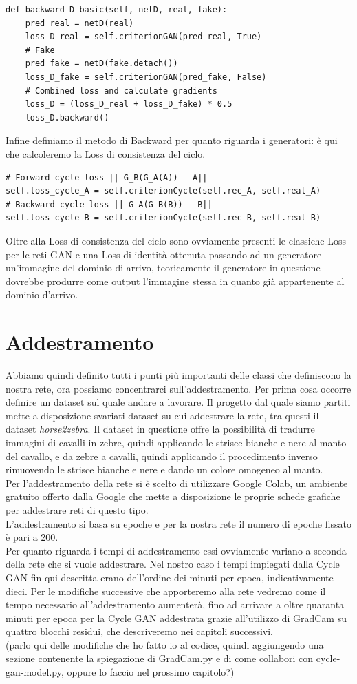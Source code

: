 \begin{verbatim}
def backward_D_basic(self, netD, real, fake):
    pred_real = netD(real)
    loss_D_real = self.criterionGAN(pred_real, True)
    # Fake
    pred_fake = netD(fake.detach())
    loss_D_fake = self.criterionGAN(pred_fake, False)
    # Combined loss and calculate gradients
    loss_D = (loss_D_real + loss_D_fake) * 0.5
    loss_D.backward()
\end{verbatim}
Infine definiamo il metodo di Backward per quanto riguarda i generatori: è qui che calcoleremo la Loss di consistenza del ciclo. 
\begin{verbatim}
# Forward cycle loss || G_B(G_A(A)) - A||
self.loss_cycle_A = self.criterionCycle(self.rec_A, self.real_A)
# Backward cycle loss || G_A(G_B(B)) - B||
self.loss_cycle_B = self.criterionCycle(self.rec_B, self.real_B)
\end{verbatim}
Oltre alla Loss di consistenza del ciclo sono ovviamente presenti le classiche Loss per le reti GAN e una Loss di identità ottenuta passando ad un generatore un'immagine del dominio di arrivo, teoricamente il generatore in questione dovrebbe produrre come output l'immagine stessa in quanto già appartenente al dominio d'arrivo.

\section{Addestramento}
Abbiamo quindi definito tutti i punti più importanti delle classi che definiscono la nostra rete, ora possiamo concentrarci sull'addestramento. Per prima cosa occorre definire un dataset sul quale andare a lavorare. Il progetto dal quale siamo partiti mette a disposizione svariati dataset su cui addestrare la rete, tra questi il dataset \emph{horse2zebra}. Il dataset in questione offre la possibilità di tradurre immagini di cavalli in zebre, quindi applicando le strisce bianche e nere al manto del cavallo, e da zebre a cavalli, quindi applicando il procedimento inverso rimuovendo le strisce bianche e nere e dando un colore omogeneo al manto.
\\Per l'addestramento della rete si è scelto di utilizzare Google Colab, un ambiente gratuito offerto dalla Google che mette a disposizione le proprie schede grafiche per addestrare reti di questo tipo. 
\\L'addestramento si basa su epoche e per la nostra rete il numero di epoche fissato è pari a 200.
\\Per quanto riguarda i tempi di addestramento essi ovviamente variano a seconda della rete che si vuole addestrare. Nel nostro caso i tempi impiegati dalla Cycle GAN fin qui descritta erano dell'ordine dei minuti per epoca, indicativamente dieci. Per le modifiche successive che apporteremo alla rete vedremo come il tempo necessario all'addestramento aumenterà, fino ad arrivare a oltre quaranta minuti per epoca per la Cycle GAN addestrata grazie all'utilizzo di GradCam su quattro blocchi residui, che descriveremo nei capitoli successivi.
\\(parlo qui delle modifiche che ho fatto io al codice, quindi aggiungendo una sezione contenente la spiegazione di GradCam.py e di come collabori con cycle-gan-model.py, oppure lo faccio nel prossimo capitolo?)

